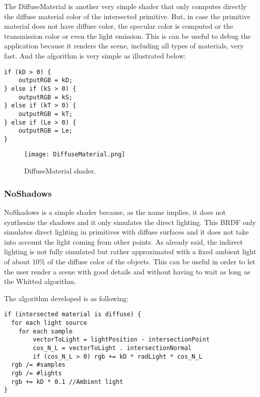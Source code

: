 \par
The DiffuseMaterial is another very simple shader that only computes directly the diffuse material color of the intersected primitive.
But, in case the primitive material does not have diffuse color, the specular color is computed or the transmission color or even the light emission.
This is can be useful to debug the application because it renders the scene, including all types of materials, very fast.
And the algorithm is very simple as illustrated below:

\begin{lstlisting}[caption={Algorithm of DiffuseMaterial Shader}, captionpos=b, label=DiffuseMaterial]
if (kD > 0) {
	outputRGB = kD;
} else if (kS > 0) {
	outputRGB = kS;
} else if (kT > 0) {
	outputRGB = kT;
} else if (Le > 0) {
	outputRGB = Le;
}
\end{lstlisting}

\begin{figure}[H]
	\centering
	\caption{DiffuseMaterial shader.}
	\label{DiffuseMaterial shader.}
	\texttt{[image: DiffuseMaterial.png]}
\end{figure}


\subsubsection{NoShadows}

\par
NoShadows is a simple shader because, as the name implies, it does not synthesize the shadows and it only simulates the direct lighting.
This BRDF only simulates direct lighting in primitives with diffuse surfaces and it does not take into account the light coming from other points.
As already said, the indirect lighting is not fully simulated but rather approximated with a fixed ambient light of about 10\% of the diffuse color of the objects.
This can be useful in order to let the user render a scene with good details and without having to wait as long as the Whitted algorithm.

\par
The algorithm developed is as following:

\begin{lstlisting}[caption={Algorithm of NoShadows Shader}, captionpos=b, label=NoShadows]
if (intersected material is diffuse) {
  for each light source
  	for each sample
	    vectorToLight = lightPosition - intersectionPoint
	    cos_N_L = vectorToLight . intersectionNormal
	    if (cos_N_L > 0) rgb += kD * radLight * cos_N_L
  rgb /= #samples
  rgb /= #lights
  rgb += kD * 0.1 //Ambient light
}
\end{lstlisting}

